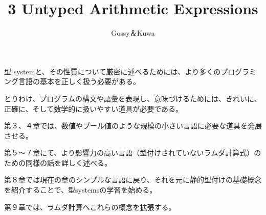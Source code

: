 \documentclass{jsarticle}
\begin{document}
\title{3 Untyped Arithmetic Expressions}
\author{Gossy＆Kuwa}
\maketitle

{\Large

型 systemと、その性質について厳密に述べるためには、より多くのプログラミング言語の基本を正しく扱う必要がある。

とりわけ、プログラムの構文や語彙を表現し、意味づけるためには、きれいに、正確に、そして数学的に扱いやすい道具が必要である。

\vspace*{1zw}

第３、４章では、数値やブール値のような規模の小さい言語に必要な道具を発展させる。

第５～７章にて、より影響力の高い言語（型付けされていないラムダ計算式）のための同様の話を詳しく述べる。

第８章では現在の章のシンプルな言語に戻り、それを元に静的型付けの基礎概念を紹介することで、型systemsの学習を始める。

第９章では、ラムダ計算へこれらの概念を拡張する。

}
\end{document}
